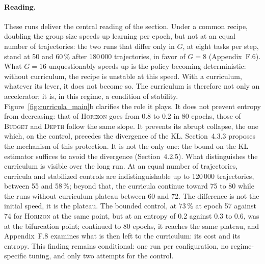 \documentclass[11pt,a4paper]{article}
\begin{document}
\paragraph{Reading.} These runs deliver the central reading of the section. Under a common recipe, doubling the group size speeds up learning per epoch, but not at an equal number of trajectories: the two runs that differ only in $G$, at eight tasks per step, stand at 50 and 60\,\% after 180\,000 trajectories, in favor of $G=8$ (Appendix~F.6). What $G=16$ unquestionably speeds up is the policy becoming deterministic: without curriculum, the recipe is unstable at this speed. With a curriculum, whatever its lever, it does not become so. The curriculum is therefore not only an accelerator; it is, in this regime, a condition of stability. Figure~\ref{fig:curricula_main}b clarifies the role it plays. It does not prevent entropy from decreasing: that of \textsc{Horizon} goes from 0.8 to 0.2 in 80 epochs, those of \textsc{Budget} and \textsc{Depth} follow the same slope. It prevents its abrupt collapse, the one which, on the control, precedes the divergence of the KL. Section~4.3.3 proposes the mechanism of this protection. It is not the only one: the bound on the KL estimator suffices to avoid the divergence (Section~4.2.5). What distinguishes the curriculum is visible over the long run. At an equal number of trajectories, curricula and stabilized controls are indistinguishable up to 120\,000 trajectories, between 55 and 58\,\%; beyond that, the curricula continue toward 75 to 80 while the runs without curriculum plateau between 60 and 72. The difference is not the initial speed, it is the plateau. The bounded control, at 73\,\% at epoch 57 against 74 for \textsc{Horizon} at the same point, but at an entropy of 0.2 against 0.3 to 0.6, was at the bifurcation point; continued to 80 epochs, it reaches the same plateau, and Appendix~F.8 examines what is then left to the curriculum: its cost and its entropy. This finding remains conditional: one run per configuration, no regime-specific tuning, and only two attempts for the control.
\end{document}
